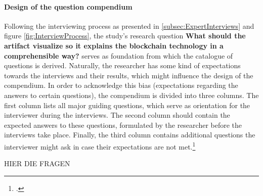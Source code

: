 \paragraph{Design of the question compendium} Following the interviewing process as presented in \ref{subsec:ExpertInterviews} and figure \ref{fig:InterviewProcess}, the study's research question \textbf{What should the artifact visualize so it explains the blockchain technology in a comprehensible way?} serves as foundation from which the catalogue of questions is derived. Naturally, the researcher has some kind of expectations towards the interviews and their results, which might influence the design of the compendium. In order to acknowledge this bias (expectations regarding the answers to certain questions), the compendium is divided into three columns. The first column lists all major guiding questions, which serve as orientation for the interviewer during the interviews. The second column should contain the expected answers to these questions, formulated by the researcher before the interviews take place. Finally, the third column contains additional questions the interviewer might ask in case their expectations are not met.\footcite[Cf.][p.431]{AghamanoukjanQualitativeInterviews2007}

HIER DIE FRAGEN

